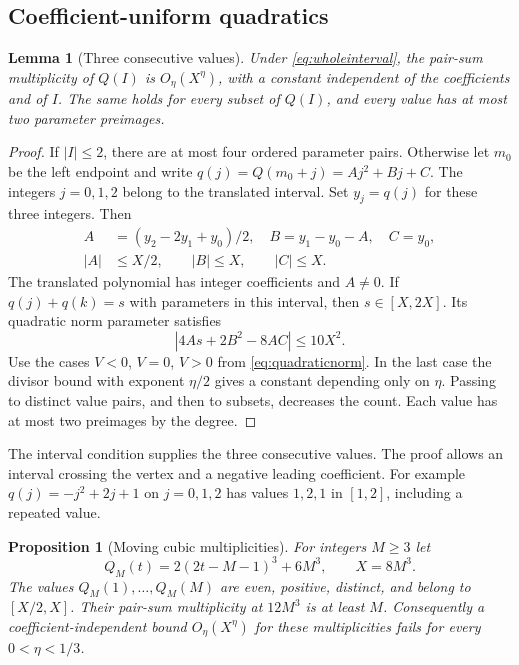 \documentclass[11pt]{article}
\newtheorem{lemma}[theorem]{Lemma}
\newtheorem{proposition}[theorem]{Proposition}
\theoremstyle{definition}
\theoremstyle{remark}
\numberwithin{equation}{section}
\begin{document}
\subsection{Coefficient-uniform quadratics}

\begin{lemma}[Three consecutive values]\label{lem:uniform}
Under \eqref{eq:wholeinterval}, the pair-sum multiplicity of $Q(I)$
is $O_\eta(X^\eta)$, with a constant independent of the coefficients
and of $I$. The same holds for every subset of $Q(I)$, and every
value has at most two parameter preimages.
\end{lemma}

\begin{proof}
If $|I|\le2$, there are at most four ordered parameter pairs.
Otherwise let $m_0$ be the left endpoint and write
$q(j)=Q(m_0+j)=Aj^2+Bj+C$. The integers $j=0,1,2$ belong to the
translated interval. Set $y_j=q(j)$ for these three integers.
Then
\begin{align}
 A&=(y_2-2y_1+y_0)/2,\quad B=y_1-y_0-A,\quad C=y_0,
                      \label{eq:coefficientformulas}\\
 |A|&\le X/2,\qquad |B|\le X,\qquad |C|\le X.
                      \label{eq:coefficientbounds}
\end{align}
The translated polynomial has integer coefficients and $A\ne0$.
If $q(j)+q(k)=s$ with parameters in this interval, then $s\in[X,2X]$.
Its quadratic norm parameter satisfies
\begin{equation}\label{eq:uniformnorm}
                     |4As+2B^2-8AC|\le10X^2.
\end{equation}
Use the cases $V<0$, $V=0$, $V>0$ from \eqref{eq:quadraticnorm}.
In the last case the divisor bound with exponent $\eta/2$ gives a
constant depending only on $\eta$. Passing to distinct value pairs,
and then to subsets, decreases the count. Each value has at most
two preimages by the degree.
\end{proof}

The interval condition supplies the three consecutive values.
The proof allows an interval crossing the vertex and a negative
leading coefficient. For example $q(j)=-j^2+2j+1$ on $j=0,1,2$
has values $1,2,1$ in $[1,2]$, including a repeated value.

\begin{proposition}[Moving cubic multiplicities]\label{prop:moving}
For integers $M\ge3$ let
\begin{equation}\label{eq:moving}
            Q_M(t)=2(2t-M-1)^3+6M^3,\qquad X=8M^3.
\end{equation}
The values $Q_M(1),\ldots,Q_M(M)$ are even, positive, distinct, and
belong to $[X/2,X]$. Their pair-sum multiplicity at $12M^3$ is at
least $M$. Consequently a coefficient-independent bound
$O_\eta(X^\eta)$ for these multiplicities fails for every
$0<\eta<1/3$.
\end{proposition}
\end{document}
